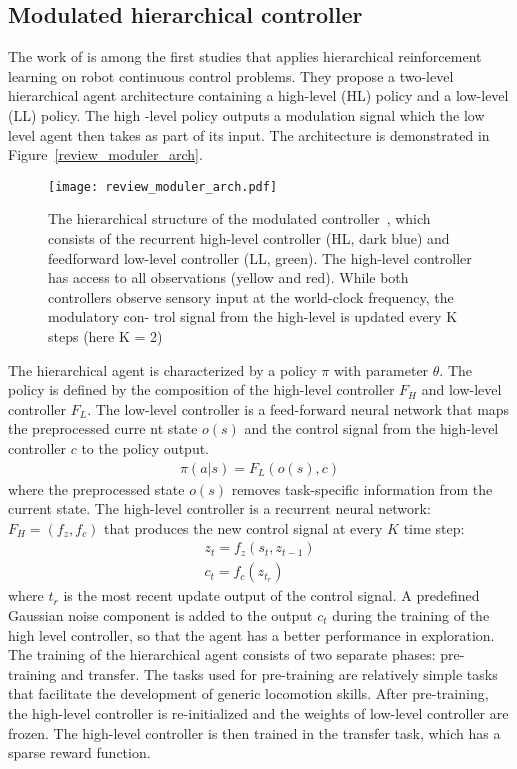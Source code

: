 \subsection{Modulated hierarchical controller}
The work of \cite{heess2016learning} is among the first studies that applies hierarchical reinforcement learning on robot continuous control problems. They propose a two-level hierarchical agent architecture containing a high-level (HL) policy and a low-level (LL) policy. The high
-level policy  outputs a modulation signal which the low level agent then takes as part of its input. The architecture is demonstrated in Figure~\ref{review_moduler_arch}.
\begin{figure}[h]
	\texttt{[image: review\_moduler\_arch.pdf]}
	\centering
	\caption{The hierarchical structure of the modulated controller~\cite{heess2016learning}, which consists
		of the recurrent high-level controller (HL, dark blue) and
		feedforward low-level controller (LL, green).  The
		high-level controller has access to all observations (yellow and red). While both controllers observe sensory
		input at the world-clock frequency, the modulatory con-
		trol signal from the high-level is updated every K
		steps (here K = 2)}
\end{figure}\label{review_moduler_arch}
The hierarchical agent is characterized by a policy $\pi$ with parameter $\theta$. The policy is defined by the composition of the high-level controller $F_H$ and low-level controller $F_L$. The low-level controller is a feed-forward neural network that maps the preprocessed curre
nt state $o(s)$ and the control signal from the high-level controller $c$ to the policy output.
\begin{align}
\pi (a| s) = F_L(o(s),c)
\end{align}
where the preprocessed state $o(s)$ removes task-specific information from the current state.
The high-level controller is a recurrent neural network: $F_H = (f_z,f_c)$ that produces the new control signal at every $K$ time step:
\begin{align}
z_t = f_z(s_t,z_{t-1}) \\
c_t = f_c(z_{t_r})
\end{align}
where $t_r$ is the most recent update output of the control signal. A predefined Gaussian noise component is added to the output $c_t$ during the training of the high level controller, so that the agent has a better performance in exploration.
The training of the hierarchical agent consists of two separate phases: pre-training and transfer. The tasks used for pre-training are relatively simple tasks that facilitate the development of generic locomotion skills. After pre-training, the high-level controller is re-initialized and the weights of low-level controller are frozen. The high-level controller is then trained in the transfer task, which has a sparse reward function.
